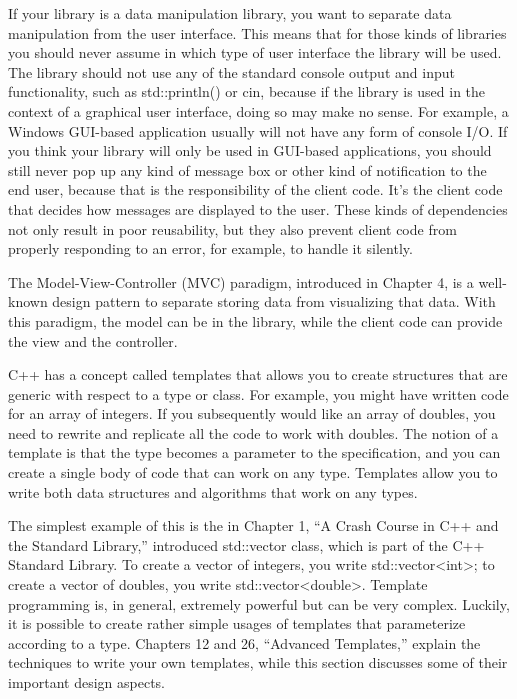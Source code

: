 
If your library is a data manipulation library, you want to separate data manipulation from the user interface. This means that for those kinds of libraries you should never assume in which type of user interface the library will be used. The library should not use any of the standard console output and input functionality, such as std::println() or cin, because if the library is used in the context of a graphical user interface, doing so may make no sense. For example, a Windows GUI-based application usually will not have any form of console I/O. If you think your library will only be used in GUI-based applications, you should still never pop up any kind of message box or other kind of notification to the end user, because that is the responsibility of the client code. It’s the client code that decides how messages are displayed to the user. These kinds of dependencies not only result in poor reusability, but they also prevent client code from properly responding to an error, for example, to handle it silently.

The Model-View-Controller (MVC) paradigm, introduced in Chapter 4, is a well-known design pattern to separate storing data from visualizing that data. With this paradigm, the model can be in the library, while the client code can provide the view and the controller.


C++ has a concept called templates that allows you to create structures that are generic with respect to a type or class. For example, you might have written code for an array of integers. If you subsequently would like an array of doubles, you need to rewrite and replicate all the code to work with doubles. The notion of a template is that the type becomes a parameter to the specification, and you can create a single body of code that can work on any type. Templates allow you to write both data structures and algorithms that work on any types.

The simplest example of this is the in Chapter 1, “A Crash Course in C++ and the Standard Library,” introduced std::vector class, which is part of the C++ Standard Library. To create a vector of integers, you write std::vector<int>; to create a vector of doubles, you write std::vector<double>. Template programming is, in general, extremely powerful but can be very complex. Luckily, it is possible to create rather simple usages of templates that parameterize according to a type. Chapters 12 and 26, “Advanced Templates,” explain the techniques to write your own templates, while this section discusses some of their important design aspects.

